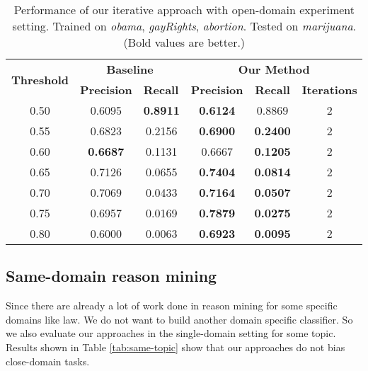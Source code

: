 \documentclass[11pt,a4paper]{article}
\begin{document}
\begin{table*}[h]
\begin{center}
\begin{tabular}{|c||c|c|c|c|c|}
\hline
\multicolumn{1}{|c|}{\multirow{2}{*}{\bf Threshold}} & \multicolumn{2}{c|}{\bf Baseline}  & \multicolumn{3}{c|}{\bf Our Method}    \\ \cline{2-6} 
\multicolumn{1}{|c|}{}   & \multicolumn{1}{l|}{\bf Precision} & \multicolumn{1}{l|}{\bf Recall} & \multicolumn{1}{l|}{\bf Precision} & \multicolumn{1}{c|}{\bf Recall} & \multicolumn{1}{l|}{\bf Iterations} \\ \hline
 \hline
0.50 & 0.6095 &\bf 0.8911 &\bf 0.6124 & 0.8869 & 2 \\
0.55 & 0.6823 & 0.2156 &\bf 0.6900 &\bf 0.2400 & 2 \\
0.60 &\bf 0.6687 & 0.1131 & 0.6667 &\bf 0.1205 & 2 \\
0.65 & 0.7126 & 0.0655 &\bf 0.7404 &\bf 0.0814 & 2 \\
0.70 & 0.7069 & 0.0433 &\bf 0.7164 &\bf 0.0507 & 2 \\
0.75 & 0.6957 & 0.0169 &\bf 0.7879 &\bf 0.0275 & 2 \\
0.80 & 0.6000 & 0.0063 &\bf 0.6923 &\bf 0.0095 & 2
\\\hline
\end{tabular}
\end{center}
\caption{\label{tab:cross-marijuana} Performance of our iterative approach with open-domain experiment setting. Trained on {\it obama}, {\it gayRights}, {\it abortion}. Tested on {\it marijuana}. (Bold values are better.)}
\end{table*}


\subsection{Same-domain reason mining}

Since there are already a lot of work done in reason mining for some specific domains like law\cite{palau2009argumentation}. We do not want to build another domain specific classifier. So we also evaluate our approaches in the single-domain setting for some topic. Results shown in Table \ref{tab:same-topic} show that our approaches do not bias close-domain tasks. 
\end{document}
